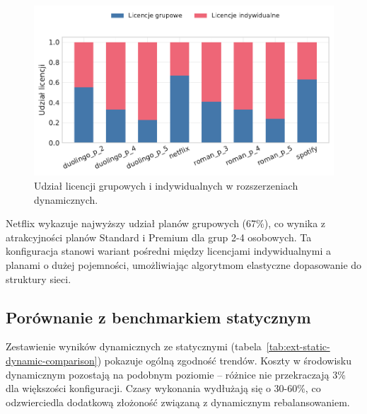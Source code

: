 \begin{figure}[H]
    \centering
    \includegraphics[width=0.8\linewidth]{assets/figures/extensions/dynamic/license_mix.pdf}
    \caption{Udział licencji grupowych i indywidualnych w rozszerzeniach dynamicznych.}
    \label{fig:ext-dynamic-license-mix}
\end{figure}

Netflix wykazuje najwyższy udział planów grupowych (67\%), co wynika z atrakcyjności planów Standard i Premium dla grup 2-4 osobowych. Ta konfiguracja stanowi wariant pośredni między licencjami indywidualnymi a planami o dużej pojemności, umożliwiając algorytmom elastyczne dopasowanie do struktury sieci.

\subsection{Porównanie z benchmarkiem statycznym}

Zestawienie wyników dynamicznych ze statycznymi (tabela~\ref{tab:ext-static-dynamic-comparison}) pokazuje ogólną zgodność trendów. Koszty w środowisku dynamicznym pozostają na podobnym poziomie -- różnice nie przekraczają 3\% dla większości konfiguracji. Czasy wykonania wydłużają się o 30-60\%, co odzwierciedla dodatkową złożoność związaną z dynamicznym rebalansowaniem.

